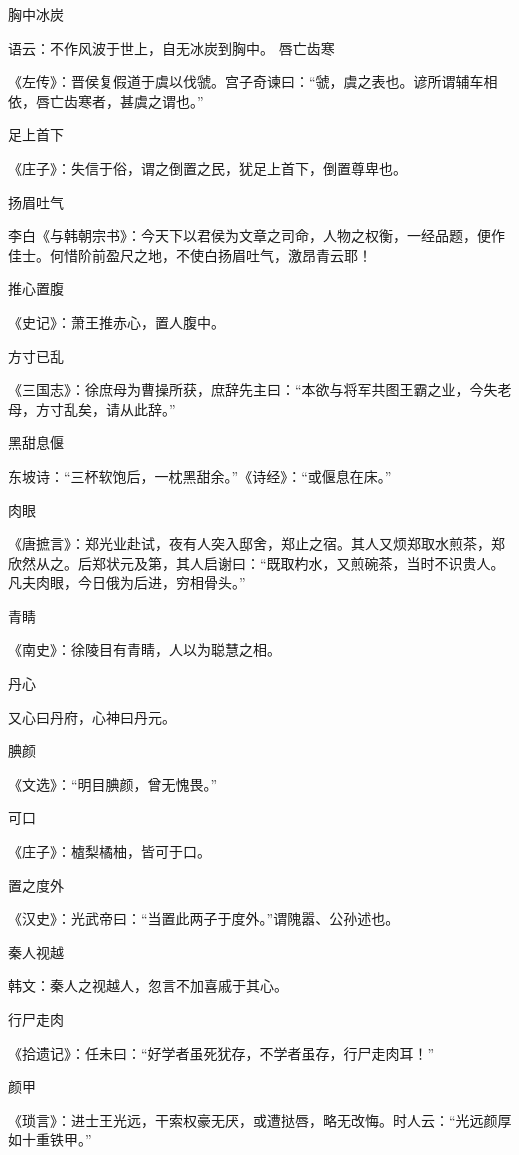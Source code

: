 \documentclass[a4paper,12pt,UTF8,twoside]{ctexbook}
\begin{document}
    胸中冰炭
    
    语云：不作风波于世上，自无冰炭到胸中。
    唇亡齿寒
    
    《左传》：晋侯复假道于虞以伐虢。宫子奇谏曰：“虢，虞之表也。谚所谓辅车相依，唇亡齿寒者，甚虞之谓也。”
    
    足上首下
    
    《庄子》：失信于俗，谓之倒置之民，犹足上首下，倒置尊卑也。
    
    扬眉吐气
    
    李白《与韩朝宗书》：今天下以君侯为文章之司命，人物之权衡，一经品题，便作佳士。何惜阶前盈尺之地，不使白扬眉吐气，激昂青云耶！
    
    推心置腹
    
    《史记》：萧王推赤心，置人腹中。
    
    方寸已乱
    
    《三国志》：徐庶母为曹操所获，庶辞先主曰：“本欲与将军共图王霸之业，今失老母，方寸乱矣，请从此辞。”
    
    黑甜息偃
    
    东坡诗：“三杯软饱后，一枕黑甜余。”《诗经》：“或偃息在床。”
    
    肉眼
    
    《唐摭言》：郑光业赴试，夜有人突入邸舍，郑止之宿。其人又烦郑取水煎茶，郑欣然从之。后郑状元及第，其人启谢曰：“既取杓水，又煎碗茶，当时不识贵人。凡夫肉眼，今日俄为后进，穷相骨头。”
    
    青睛
    
    《南史》：徐陵目有青睛，人以为聪慧之相。
    
    丹心
    
    又心曰丹府，心神曰丹元。
    
    腆颜
    
    《文选》：“明目腆颜，曾无愧畏。”
    
    可口
    
    《庄子》：樝梨橘柚，皆可于口。
    
    置之度外
    
    《汉史》：光武帝曰：“当置此两子于度外。”谓隗嚣、公孙述也。
    
    秦人视越
    
    韩文：秦人之视越人，忽言不加喜戚于其心。
    
    行尸走肉
    
    《拾遗记》：任未曰：“好学者虽死犹存，不学者虽存，行尸走肉耳！”
    
    颜甲
    
    《琐言》：进士王光远，干索权豪无厌，或遭挞唇，略无改悔。时人云：“光远颜厚如十重铁甲。”
    
\end{document}
